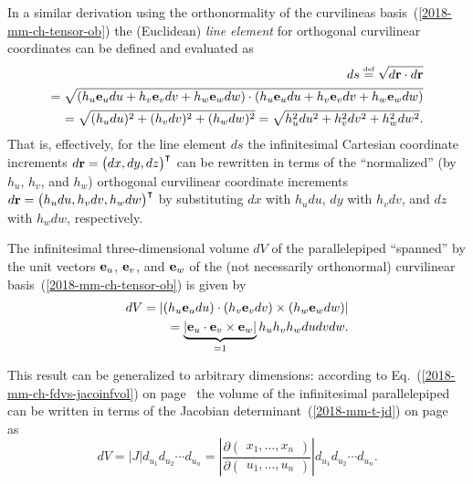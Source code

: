 In a similar derivation using the orthonormality of the curvilineas basis~(\ref{2018-mm-ch-tensor-ob})
the
(Euclidean) {\em line element }
for orthogonal curvilinear coordinates
can be defined and evaluated as
\begin{equation}
\begin{split}
ds \stackrel{{\text{\tiny def}}}{=}
\sqrt{d {\bf r} \cdot d {\bf r}}
\\ =
\sqrt{
\left(
{ h_u }{\bf e}_u   du + { h_v }{\bf e}_v   dv + { h_w } {\bf e}_w dw
\right)
\cdot
\left(
{ h_u }{\bf e}_u   du + { h_v }{\bf e}_v   dv + { h_w } {\bf e}_w dw
\right)
}
\\ =
\sqrt{
(h_u du)^2 + (h_v dv)^2 + (h_w dw)^2
}
=
\sqrt{
h_u^2 du^2 + h_v^2 dv^2 + h_w^2 dw^2
}
.
\end{split}
\label{2018-mm-ch-tensor-le}
\end{equation}
That is, effectively, for the line element $ds$ the infinitesimal Cartesian coordinate increments
$
d {\bf r}=
\begin{pmatrix}
dx, dy, dz
\end{pmatrix}^\intercal
$
can be rewritten in terms of the ``normalized'' (by $h_u$, $h_v$, and $h_w$)
orthogonal curvilinear coordinate increments
$
d {\bf r}=
\begin{pmatrix}
h_u  du , h_v dv, h_w dw
\end{pmatrix}^\intercal
$
by substituting
$dx$ with $h_u  du$,
$dy$ with $h_v  dv$, and
$dz$ with $h_w  dw$, respectively.



The infinitesimal three-dimensional volume $dV$ of the parallelepiped ``spanned'' by the
unit vectors
${\bf e}_{u}$, ${\bf e}_{v}$, and ${\bf e}_{w}$
of the (not necessarily orthonormal)
curvilinear basis~(\ref{2018-mm-ch-tensor-ob})
is given by
\begin{equation}
\begin{split}
dV =
\left|
(h_u {\bf e}_u du) \cdot
(h_v {\bf e}_v dv) \times
(h_w {\bf e}_w dw)
\right|
\\ =
\underbrace{\left| {\bf e}_u \cdot  {\bf e}_v \times {\bf e}_w \right|}_{=1}
h_u h_v h_w  du dv dw
.
\end{split}
\label{2018-mm-ch-tensor-veoclc}
\end{equation}

This result can be generalized to arbitrary dimensions:
according to Eq.~(\ref{2018-mm-ch-fdvs-jacoinfvol})
on page~\pageref{2018-mm-ch-fdvs-jacoinfvol}
the volume of the infinitesimal parallelepiped
can be written in terms  of the Jacobian determinant~(\ref{2018-mm-t-jd}) on page~\pageref{2018-mm-t-jd}
as
\begin{equation}
dV =
\left| J \right|
d_{u_1} d_{u_2} \cdots d_{u_n}
 =
\left|
\frac{
\partial \begin{pmatrix}x_1, \ldots , x_n \end{pmatrix}
}
{
\partial \begin{pmatrix} u_1, \ldots , u_n \end{pmatrix}
}
\right|
d_{u_1} d_{u_2} \cdots d_{u_n}
.
\label{2018-mm-ch-tensor-veoclcjd}
\end{equation}


